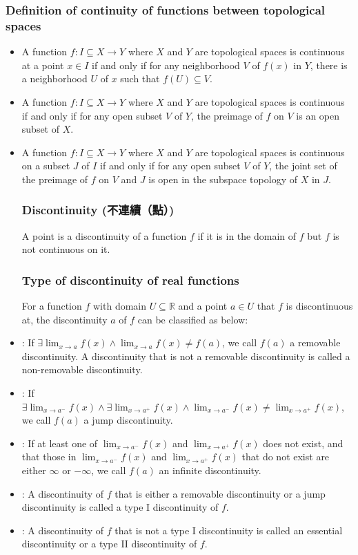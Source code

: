 \begin{itemize}
\subsubsection{Definition of continuity of functions between topological spaces}
\begin{itemize}
\item A function $f\colon I\subseteq X\to Y$ where $X$ and $Y$ are topological spaces is continuous at a point $x\in I$ if and only if for any neighborhood $V$ of $f(x)$ in $Y$, there is a neighborhood $U$ of $x$ such that $f(U)\subseteq V$.
\item A function $f\colon I\subseteq X\to Y$ where $X$ and $Y$ are topological spaces is continuous if and only if for any open subset $V$ of $Y$, the preimage of $f$ on $V$ is an open subset of $X$.
\item A function $f\colon I\subseteq X\to Y$ where $X$ and $Y$ are topological spaces is continuous on a subset $J$ of $I$ if and only if for any open subset $V$ of $Y$, the joint set of the preimage of $f$ on $V$ and $J$ is open in the subspace topology of $X$ in $J$.
\eit
\subsubsection{Discontinuity (不連續（點）)}
A point is a discontinuity of a function $f$ if it is in the domain of $f$ but $f$ is not continuous on it.
\subsubsection{Type of discontinuity of real functions}
For a function $f$ with domain $U\subseteq\mathbb{R}$ and a point $a\in U$ that $f$ is discontinuous at, the discontinuity $a$ of $f$ can be classified as below:
\bit
\item {}: If $\exists\lim_{x\to a}f(x)\land\lim_{x\to a}f(x)\neq f(a)$, we call $f(a)$ a removable discontinuity. A discontinuity that is not a removable discontinuity is called a non-removable discontinuity.
\item {}: If $\exists\lim_{x\to a^-}f(x)\land\exists\lim_{x\to a^+}f(x)\land\lim_{x\to a^-}f(x)\neq\lim_{x\to a^+}f(x)$, we call $f(a)$ a jump discontinuity.
\item{}: If at least one of $\lim_{x\to a^-}f(x)$ and $\lim_{x\to a^+}f(x)$ does not exist, and that those in $\lim_{x\to a^-}f(x)$ and $\lim_{x\to a^+}f(x)$ that do not exist are either $\infty$ or $-\infty$, we call $f(a)$ an infinite discontinuity.
\item{}: A discontinuity of $f$ that is either a removable discontinuity or a jump discontinuity is called a type I discontinuity of $f$.
\item{}: A discontinuity of $f$ that is not a type I discontinuity is called an essential discontinuity or a type II discontinuity of $f$.
\eit

\end{itemize}
\end{itemize}
